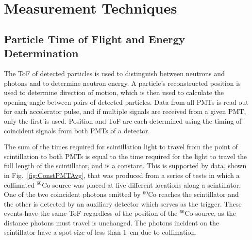 \section{Measurement Techniques}
\subsection{Particle Time of Flight and Energy Determination}
\label{ToF_reconstruction}
The ToF of detected particles is used to distinguish between neutrons and photons and to determine neutron energy.
A particle's reconstructed position is used to determine direction of motion, which is then used to calculate the opening angle between pairs of detected particles.
Data from all PMTs is read out for each accelerator pulse, and if multiple signals are received from a given PMT, only the first is used.
Position and ToF are each determined using the timing of coincident signals from both PMTs of a detector.

The sum of the times required for scintillation light to travel from the point of scintillation to both PMTs is equal to the time required for the light to travel the full length of the scintillator, and is a constant.
This is supported by data, shown in Fig.~\ref{fig:ConstPMTAvg}, that was produced from a series of tests in which a collimated $^{60}$Co source was placed at five different locations along a scintillator.
One of the two coincident photons emitted by $^{60}$Co reaches the scintillator and the other is detected by an auxiliary detector which serves as the trigger. 
These events have the same ToF regardless of the position of the $^{60}$Co source, as the distance photons must travel is unchanged. 
The photons incident on the scintillator have a spot size of less than 1~cm due to collimation.

